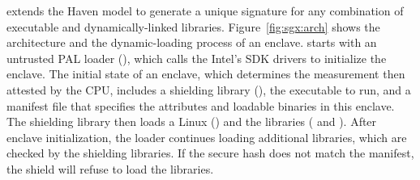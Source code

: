








\graphenesgx{} extends the Haven model to generate a unique signature for
any combination of executable and dynamically-linked libraries.
Figure~\ref{fig:sgx:arch} shows the architecture and the dynamic-loading process
of an enclave. %
\graphenesgx{} starts with an untrusted PAL loader (), which calls the Intel's SDK \sgx{} drivers to initialize the enclave.
The initial state of an enclave, which determines the measurement then 
attested by the CPU, includes a shielding library (),
the executable to run,
and a manifest file that specifies the attributes and loadable binaries in this enclave.
The shielding library then loads a Linux \libos{} () and the \glibc{} libraries ( and ).
After enclave initialization, the loader continues loading
additional libraries, which are checked by the shielding libraries.
If the secure hash does not match the manifest, the shield will refuse to load the libraries.

